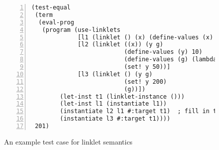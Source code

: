 \begin{figure}[!h]
\centering

\begin{minipage}{0.8\textwidth}
\begin{lstlisting}[language=racket,
                basicstyle=\ttfamily\footnotesize,
                numbers=left, xleftmargin=2em, numberstyle=\tiny]
(test-equal
 (term
  (eval-prog
   (program (use-linklets
             [l1 (linklet () (x) (define-values (x) 1))]
             [l2 (linklet ((x)) (y g)
                          (define-values (y) 10)
                          (define-values (g) (lambda (p) (+ x y)))
                          (set! y 50))]
             [l3 (linklet () (y g)
                          (set! y 200)
                          (g))])
        (let-inst t1 (linklet-instance ()))
        (let-inst l1 (instantiate l1))
        (instantiate l2 l1 #:target t1)  ; fill in the target
        (instantiate l3 #:target t1))))
 201)
\end{lstlisting}
\caption{An example test case for linklet semantics}
\label{fig:test-equal-listing}
\end{minipage}
\end{figure}